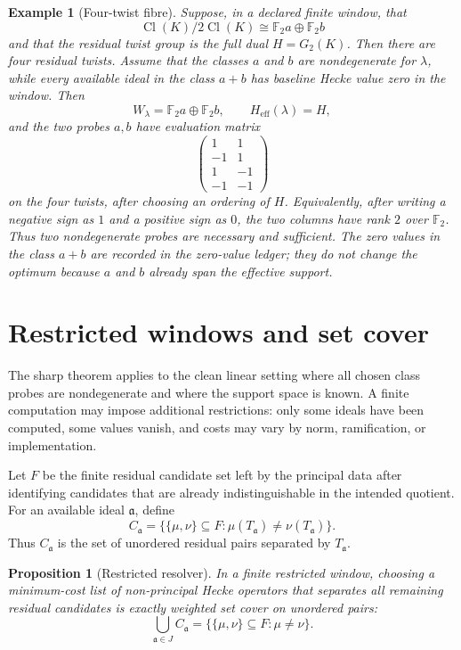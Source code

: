 \documentclass[11pt]{article}
\newtheorem{proposition}[theorem]{Proposition}
\newtheorem{example}[theorem]{Example}
\DeclareMathOperator{\Cl}{Cl}
\begin{document}
\begin{example}[Four-twist fibre]
Suppose, in a declared finite window, that
\[
\Cl(K)/2\Cl(K)\cong \mathbb F_2 a\oplus \mathbb F_2 b
\]
and that the residual twist group is the full dual \(H=G_2(K)\).  Then there are four residual twists.  Assume that the classes \(a\) and \(b\) are nondegenerate for \(\lambda\), while every available ideal in the class \(a+b\) has baseline Hecke value zero in the window.  Then
\[
W_\lambda=\mathbb F_2 a\oplus \mathbb F_2 b,
\qquad
H_{\mathrm{eff}}(\lambda)=H,
\]
and the two probes \(a,b\) have evaluation matrix
\[
\begin{pmatrix}
1&1\\
-1&1\\
1&-1\\
-1&-1
\end{pmatrix}
\]
on the four twists, after choosing an ordering of \(H\).  Equivalently, after writing a negative sign as \(1\) and a positive sign as \(0\), the two columns have rank \(2\) over \(\mathbb F_2\).  Thus two nondegenerate probes are necessary and sufficient.  The zero values in the class \(a+b\) are recorded in the zero-value ledger; they do not change the optimum because \(a\) and \(b\) already span the effective support.
\end{example}

\section{Restricted windows and set cover}

The sharp theorem applies to the clean linear setting where all chosen class probes are nondegenerate and where the support space is known.  A finite computation may impose additional restrictions: only some ideals have been computed, some values vanish, and costs may vary by norm, ramification, or implementation.

Let \(F\) be the finite residual candidate set left by the principal data after identifying candidates that are already indistinguishable in the intended quotient.  For an available ideal \(\mathfrak a\), define
\[
C_{\mathfrak a}=
\{\{\mu,\nu\}\subseteq F:
\mu(T_{\mathfrak a})\neq\nu(T_{\mathfrak a})\}.
\]
Thus \(C_{\mathfrak a}\) is the set of unordered residual pairs separated by \(T_{\mathfrak a}\).

\begin{proposition}[Restricted resolver]
In a finite restricted window, choosing a minimum-cost list of non-principal Hecke operators that separates all remaining residual candidates is exactly weighted set cover on unordered pairs:
\[
\bigcup_{\mathfrak a\in J}C_{\mathfrak a}
=
\{\{\mu,\nu\}\subseteq F:\mu\neq\nu\}.
\]
\end{proposition}
\end{document}
